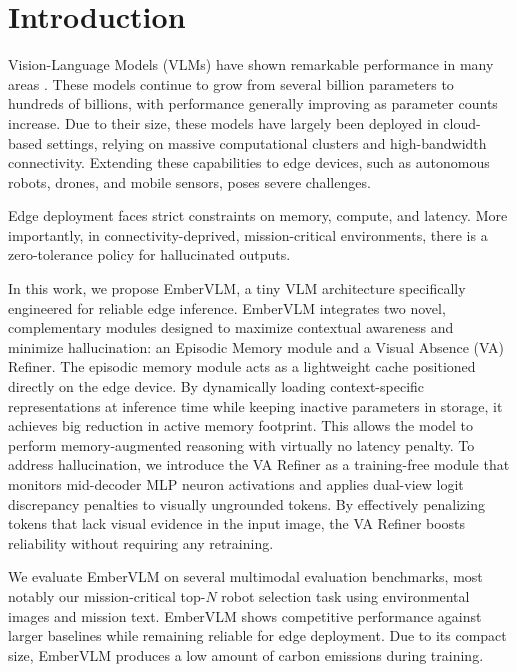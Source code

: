 \documentclass[runningheads]{llncs}
\begin{document}
\section{Introduction}
\label{sec:intro}

Vision-Language Models (VLMs) have shown remarkable performance in many areas \cite{li2022blipbootstrappinglanguageimagepretraining,alayrac2022flamingovisuallanguagemodel, radford2021learningtransferablevisualmodels}. These models continue to grow from several billion parameters to hundreds of billions, with performance generally improving as parameter counts increase. Due to their size, these models have largely been deployed in cloud-based settings, relying on massive computational clusters and high-bandwidth connectivity. Extending these capabilities to edge devices, such as autonomous robots, drones, and mobile sensors, poses severe challenges.

Edge deployment faces strict constraints on memory, compute, and latency. More importantly, in connectivity-deprived, mission-critical environments, there is a zero-tolerance policy for hallucinated outputs.

In this work, we propose EmberVLM, a tiny VLM architecture specifically engineered for reliable edge inference. EmberVLM integrates two novel, complementary modules designed to maximize contextual awareness and minimize hallucination: an Episodic Memory module and a Visual Absence (VA) Refiner. The episodic memory module acts as a lightweight cache positioned directly on the edge device. By dynamically loading context-specific representations at inference time while keeping inactive parameters in storage, it achieves big reduction in active memory footprint. This allows the model to perform memory-augmented reasoning with virtually no latency penalty. To address hallucination, we introduce the VA Refiner as a training-free module that monitors mid-decoder MLP neuron activations and applies dual-view logit discrepancy penalties to visually ungrounded tokens. By effectively penalizing tokens that lack visual evidence in the input image, the VA Refiner boosts reliability without requiring any retraining.

We evaluate EmberVLM on several multimodal evaluation benchmarks, most notably our mission-critical top-$N$ robot selection task using environmental images and mission text. EmberVLM shows competitive performance against larger baselines while remaining reliable for edge deployment. Due to its compact size, EmberVLM produces a low amount of carbon emissions during training.
\end{document}
